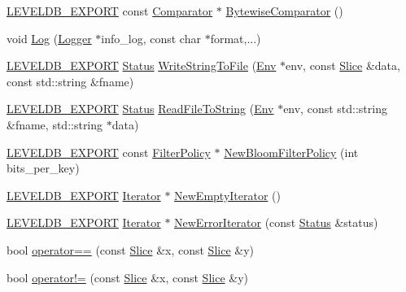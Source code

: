 \begin{DoxyCompactItemize}
\item 
\mbox{\hyperlink{export_8h_a658cd25b9dd114d894ae8ce9dddb7d3a}{L\+E\+V\+E\+L\+D\+B\+\_\+\+E\+X\+P\+O\+RT}} const \mbox{\hyperlink{structleveldb_1_1_comparator}{Comparator}} $\ast$ \mbox{\hyperlink{namespaceleveldb_aaefedd89ff6910738cb4c8e629087b93}{Bytewise\+Comparator}} ()
\item 
void \mbox{\hyperlink{namespaceleveldb_aeba9623ceee38be99bed2bc1ae082954}{Log}} (\mbox{\hyperlink{classleveldb_1_1_logger}{Logger}} $\ast$info\+\_\+log, const char $\ast$format,...)
\item 
\mbox{\hyperlink{export_8h_a658cd25b9dd114d894ae8ce9dddb7d3a}{L\+E\+V\+E\+L\+D\+B\+\_\+\+E\+X\+P\+O\+RT}} \mbox{\hyperlink{classleveldb_1_1_status}{Status}} \mbox{\hyperlink{namespaceleveldb_aa921f8824045bed5a75e2220a65bf68d}{Write\+String\+To\+File}} (\mbox{\hyperlink{classleveldb_1_1_env}{Env}} $\ast$env, const \mbox{\hyperlink{classleveldb_1_1_slice}{Slice}} \&data, const std\+::string \&fname)
\item 
\mbox{\hyperlink{export_8h_a658cd25b9dd114d894ae8ce9dddb7d3a}{L\+E\+V\+E\+L\+D\+B\+\_\+\+E\+X\+P\+O\+RT}} \mbox{\hyperlink{classleveldb_1_1_status}{Status}} \mbox{\hyperlink{namespaceleveldb_a2d2b5dcaccd555df746cc89ffcd9cd05}{Read\+File\+To\+String}} (\mbox{\hyperlink{classleveldb_1_1_env}{Env}} $\ast$env, const std\+::string \&fname, std\+::string $\ast$data)
\item 
\mbox{\hyperlink{export_8h_a658cd25b9dd114d894ae8ce9dddb7d3a}{L\+E\+V\+E\+L\+D\+B\+\_\+\+E\+X\+P\+O\+RT}} const \mbox{\hyperlink{classleveldb_1_1_filter_policy}{Filter\+Policy}} $\ast$ \mbox{\hyperlink{namespaceleveldb_a5d57a5a062beeef209ee7c7113de8cce}{New\+Bloom\+Filter\+Policy}} (int bits\+\_\+per\+\_\+key)
\item 
\mbox{\hyperlink{export_8h_a658cd25b9dd114d894ae8ce9dddb7d3a}{L\+E\+V\+E\+L\+D\+B\+\_\+\+E\+X\+P\+O\+RT}} \mbox{\hyperlink{classleveldb_1_1_iterator}{Iterator}} $\ast$ \mbox{\hyperlink{namespaceleveldb_aa195cd33d90cdb6194264f0475af6c95}{New\+Empty\+Iterator}} ()
\item 
\mbox{\hyperlink{export_8h_a658cd25b9dd114d894ae8ce9dddb7d3a}{L\+E\+V\+E\+L\+D\+B\+\_\+\+E\+X\+P\+O\+RT}} \mbox{\hyperlink{classleveldb_1_1_iterator}{Iterator}} $\ast$ \mbox{\hyperlink{namespaceleveldb_a192c5c146be88c57010621727cb27e2c}{New\+Error\+Iterator}} (const \mbox{\hyperlink{classleveldb_1_1_status}{Status}} \&status)
\item 
bool \mbox{\hyperlink{namespaceleveldb_a53c443def2386ea299281cf36de3ae4b}{operator==}} (const \mbox{\hyperlink{classleveldb_1_1_slice}{Slice}} \&x, const \mbox{\hyperlink{classleveldb_1_1_slice}{Slice}} \&y)
\item 
bool \mbox{\hyperlink{namespaceleveldb_a6592a36834e5a52b66cc8357c7ef806b}{operator!=}} (const \mbox{\hyperlink{classleveldb_1_1_slice}{Slice}} \&x, const \mbox{\hyperlink{classleveldb_1_1_slice}{Slice}} \&y)
\end{DoxyCompactItemize}
